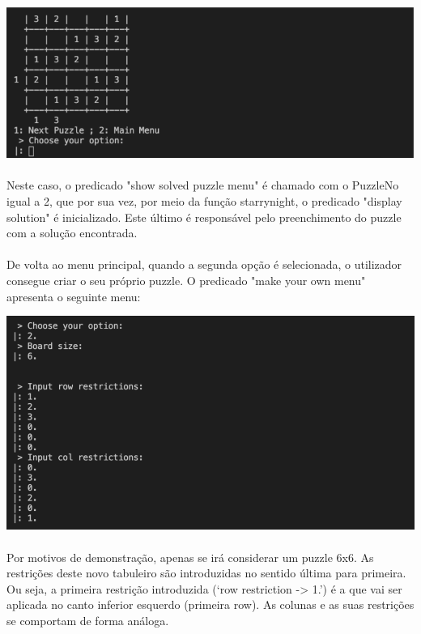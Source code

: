 \documentclass[a4paper]{article}
\begin{document}
\begin{center}
    \includegraphics[scale=0.4]{img/4.png}
\end{center}

\paragraph{} 
Neste caso, o predicado "show solved puzzle menu" é chamado com o PuzzleNo igual a 2, que por sua vez, por meio da função starrynight, o predicado "display solution" é inicializado. Este último é responsável pelo preenchimento do puzzle com a solução encontrada.

\paragraph{} 
De volta ao menu principal, quando a segunda opção é selecionada, o utilizador consegue criar o seu próprio puzzle. O predicado "make your own menu" apresenta o seguinte menu:

\begin{center}
    \includegraphics[scale=0.4]{img/5.png}
\end{center}

\paragraph{} 
Por motivos de demonstração, apenas se irá considerar um puzzle 6x6. As restrições deste novo tabuleiro são introduzidas no sentido última para primeira. Ou seja, a primeira restrição introduzida (‘row restriction -> 1.’) é a que vai ser aplicada no canto inferior esquerdo (primeira row). As colunas e as suas restrições se comportam de forma análoga. 
\end{document}
